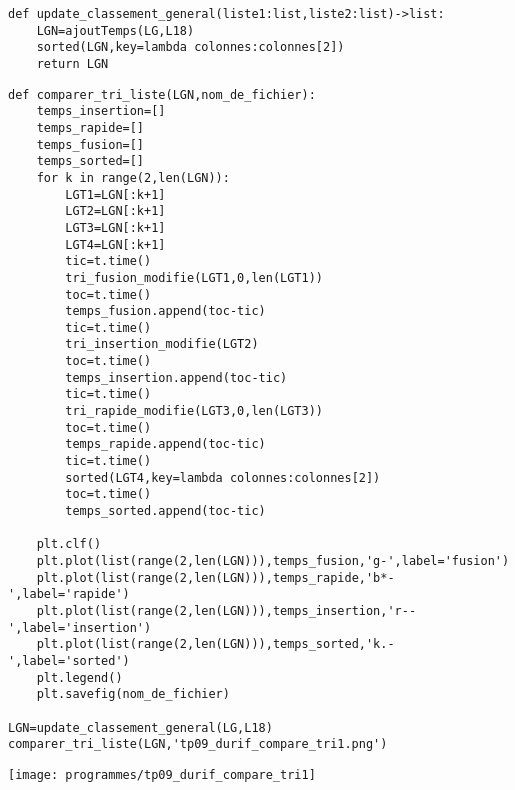

\begin{lstlisting}
def update_classement_general(liste1:list,liste2:list)->list:
    LGN=ajoutTemps(LG,L18)
    sorted(LGN,key=lambda colonnes:colonnes[2])
    return LGN
\end{lstlisting}





\begin{lstlisting}
def comparer_tri_liste(LGN,nom_de_fichier):
    temps_insertion=[]
    temps_rapide=[]
    temps_fusion=[]
    temps_sorted=[]
    for k in range(2,len(LGN)):
        LGT1=LGN[:k+1]
        LGT2=LGN[:k+1]
        LGT3=LGN[:k+1]
        LGT4=LGN[:k+1]
        tic=t.time()
        tri_fusion_modifie(LGT1,0,len(LGT1))
        toc=t.time()
        temps_fusion.append(toc-tic)
        tic=t.time()
        tri_insertion_modifie(LGT2)
        toc=t.time()
        temps_insertion.append(toc-tic)
        tic=t.time()
        tri_rapide_modifie(LGT3,0,len(LGT3))
        toc=t.time()
        temps_rapide.append(toc-tic)
        tic=t.time()
        sorted(LGT4,key=lambda colonnes:colonnes[2])
        toc=t.time()
        temps_sorted.append(toc-tic)

    plt.clf()
    plt.plot(list(range(2,len(LGN))),temps_fusion,'g-',label='fusion')
    plt.plot(list(range(2,len(LGN))),temps_rapide,'b*-',label='rapide')
    plt.plot(list(range(2,len(LGN))),temps_insertion,'r--',label='insertion')
    plt.plot(list(range(2,len(LGN))),temps_sorted,'k.-',label='sorted')
    plt.legend()
    plt.savefig(nom_de_fichier)

LGN=update_classement_general(LG,L18)
comparer_tri_liste(LGN,'tp09_durif_compare_tri1.png')
\end{lstlisting}


\begin{center}
\texttt{[image: programmes/tp09\_durif\_compare\_tri1]}
\end{center}

